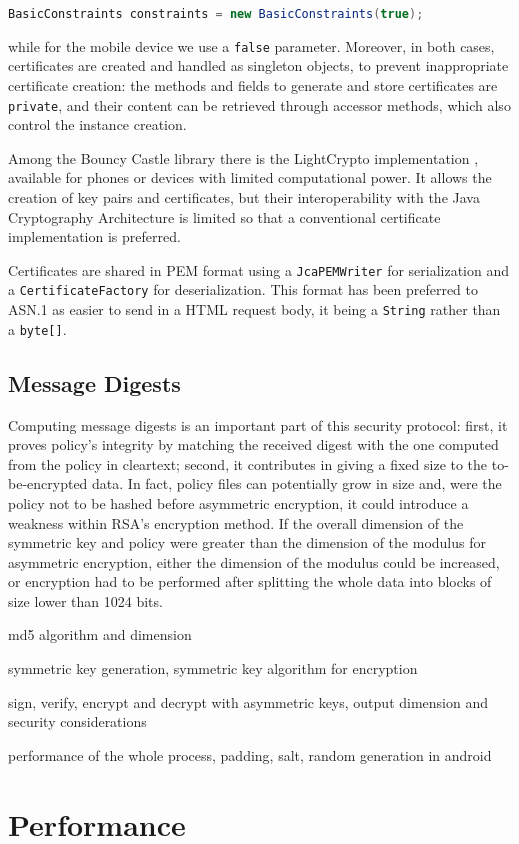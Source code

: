 \lstinline[language=java]!BasicConstraints constraints = new BasicConstraints(true);!

while for the mobile device we use a \texttt{false} parameter. Moreover, in both cases, certificates are created and handled as singleton objects, to prevent inappropriate certificate creation: the methods and fields to generate and store certificates are \texttt{private}, and their content can be retrieved through accessor methods, which also control the instance creation.

Among the Bouncy Castle library there is the LightCrypto implementation \cite{LightCrypto}, available for phones or devices with limited computational power. It allows the creation of key pairs and certificates, but their interoperability with the Java Cryptography Architecture is limited so that a conventional certificate implementation is preferred. 

Certificates are shared in PEM format using a \texttt{JcaPEMWriter} for serialization and a \texttt{CertificateFactory} for deserialization. This format has been preferred to ASN.1 as easier to send in a HTML request body, it being a \texttt{String} rather than a \texttt{byte[]}.

\subsection{Message Digests}
Computing message digests is an important part of this security protocol: first, it proves policy's integrity by matching the received digest with the one computed from the policy in cleartext; second, it contributes in giving a fixed size to the to-be-encrypted data. In fact, policy files can potentially grow in size and, were the policy not to be hashed before asymmetric encryption, it could introduce a weakness within RSA's encryption method. If the overall dimension of the symmetric key and policy were greater than the dimension of the modulus for asymmetric encryption, either the dimension of the modulus could be increased, or encryption had to be performed after splitting the whole data into blocks of size lower than 1024 bits.




md5 algorithm and dimension

symmetric key generation, symmetric key algorithm for encryption

sign, verify, encrypt and decrypt with asymmetric keys, output dimension and security considerations 

performance of the whole process, padding, salt, random generation in android


\section{Performance}


